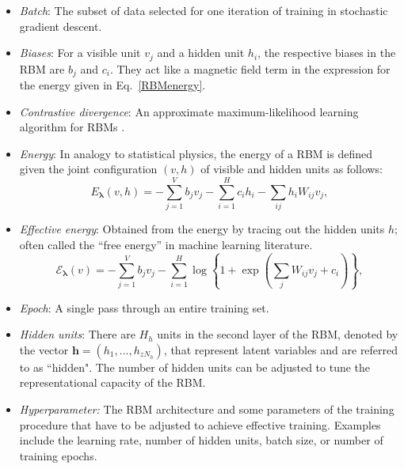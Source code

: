 \documentclass[submission, Phys, hidelinks]{SciPost}
\begin{document}
\begin{itemize}

\item {\it Batch}: The subset of data selected for one iteration of training in stochastic gradient descent.

\item {\it Biases}: For a visible unit $v_j$ and a hidden unit $h_i$, the respective biases in the RBM are $b_j$ and $c_i$. They act like a magnetic field term in the expression for the energy given in Eq.~\eqref{RBMenergy}.

\item {\it Contrastive divergence}: An approximate maximum-likelihood learning algorithm for RBMs \cite{hinton2002training}.

\item {\it Energy}: In analogy to statistical physics, the energy of a RBM is defined given the joint configuration $(v, h)$ of visible and hidden units as follows:
\begin{equation}
   E_{\bm{\lambda}}(v,h) = - \sum\limits_{j=1}^V b_j v_j - \sum\limits_{i=1}^H c_i h_i - \sum\limits_{ij} h_i W_{ij} v_j, \label{RBMenergy}
\end{equation}

\item {\it Effective energy}: Obtained from the energy by tracing out the hidden units $h$; often called the ``free energy'' in machine learning literature.
\begin{equation}
   \mathcal{E}_{\bm{\lambda}}(v) = - \sum\limits_{j=1}^V b_j v_j - \sum\limits_{i=1}^H \log \left\{ 1 + \exp \left( \sum\limits_{j} W_{ij}v_j +c_i\right) \right\}, \label{RBMeffectiveenergy}
\end{equation}

\item {\it Epoch}: A single pass through an entire training set.

\item {\it Hidden units}: There are $H_h$ units in the second layer of the RBM, denoted by the vector $\mathbf{h}=(h_1, ..., h_{zN_h})$, that represent latent variables and are referred to as ``hidden". The number of hidden units can be adjusted to tune the representational capacity of the RBM.

\item{\it Hyperparameter:} The RBM architecture and some parameters of the training procedure that have to be adjusted to achieve effective training. Examples include the learning rate, number of hidden units, batch size, or number of training epochs.


\end{itemize}
\end{document}
